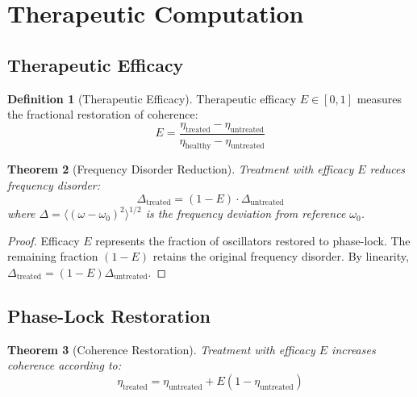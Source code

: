\documentclass[10pt,twocolumn]{article}
\theoremstyle{plain}
\newtheorem{theorem}{Theorem}[section]
\theoremstyle{definition}
\newtheorem{definition}[theorem]{Definition}
\theoremstyle{remark}
\begin{document}
\section{Therapeutic Computation}
\label{sec:therapeutic}

\subsection{Therapeutic Efficacy}

\begin{definition}[Therapeutic Efficacy]
\label{def:efficacy}
Therapeutic efficacy $E \in [0,1]$ measures the fractional restoration of coherence:
\begin{equation}
E = \frac{\eta_{\mathrm{treated}} - \eta_{\mathrm{untreated}}}{\eta_{\mathrm{healthy}} - \eta_{\mathrm{untreated}}}
\label{eq:efficacy}
\end{equation}
\end{definition}

\begin{theorem}[Frequency Disorder Reduction]
\label{thm:disorder}
Treatment with efficacy $E$ reduces frequency disorder:
\begin{equation}
\Delta_{\mathrm{treated}} = (1 - E) \cdot \Delta_{\mathrm{untreated}}
\label{eq:disorder_reduction}
\end{equation}
where $\Delta = \langle(\omega - \omega_0)^2\rangle^{1/2}$ is the frequency deviation from reference $\omega_0$.
\end{theorem}

\begin{proof}
Efficacy $E$ represents the fraction of oscillators restored to phase-lock. The remaining fraction $(1-E)$ retains the original frequency disorder. By linearity, $\Delta_{\mathrm{treated}} = (1-E)\Delta_{\mathrm{untreated}}$.
\end{proof}

\subsection{Phase-Lock Restoration}

\begin{theorem}[Coherence Restoration]
\label{thm:restoration}
Treatment with efficacy $E$ increases coherence according to:
\begin{equation}
\eta_{\mathrm{treated}} = \eta_{\mathrm{untreated}} + E(1 - \eta_{\mathrm{untreated}})
\label{eq:restoration}
\end{equation}
\end{theorem}
\end{document}
